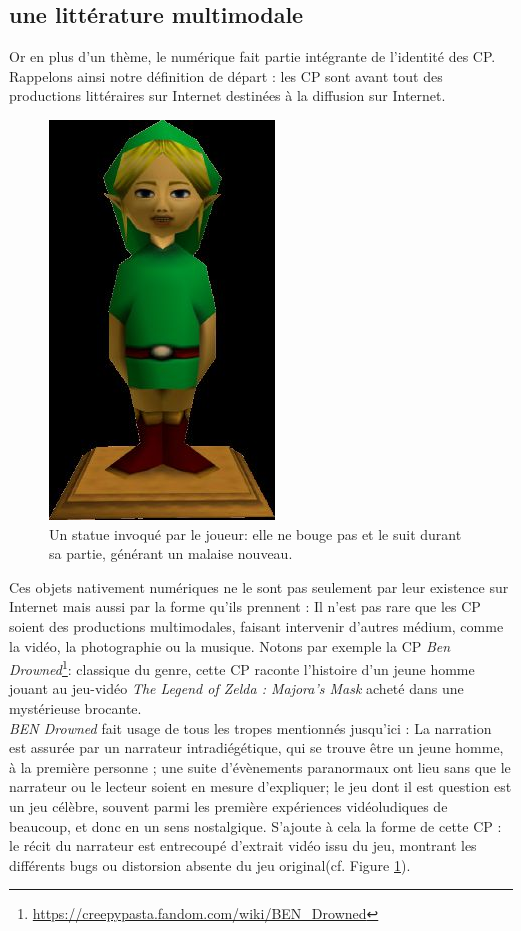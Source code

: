 \documentclass[12pt,a4paper,oneside,titlepage]{book} %
\begin{document}
\subsection{une littérature multimodale}
Or en plus d’un thème, le numérique fait partie intégrante de l’identité des CP. Rappelons ainsi notre définition de départ : les CP sont avant tout des productions littéraires sur Internet destinées à la diffusion sur Internet. 
	\begin{figure}
	\centering
	\includegraphics[scale=0.35]{illustration/ben_drowned1}
	\caption{\small Un statue invoqué par le joueur: elle ne bouge pas et le suit durant sa partie, générant un malaise nouveau.}
	\label{img:ben_drowned}
\end{figure}

Ces objets nativement numériques ne le sont pas seulement par leur existence sur Internet mais aussi par la forme qu’ils prennent : Il n’est pas rare que les CP soient des productions multimodales, faisant intervenir d’autres médium, comme la vidéo, la photographie ou la musique. Notons par exemple la CP \emph{Ben Drowned}\footnote{\url{https://creepypasta.fandom.com/wiki/BEN_Drowned}}: classique du genre, cette CP raconte l’histoire d’un jeune homme jouant au jeu-vidéo \emph{The Legend of Zelda : Majora's Mask} acheté dans une mystérieuse brocante. \\


\emph{BEN Drowned} fait usage de tous les tropes mentionnés jusqu'ici : La narration est assurée par un narrateur intradiégétique, qui se trouve être un jeune homme, à la première personne ;  une suite d'évènements paranormaux ont lieu sans que le narrateur ou le lecteur soient en mesure d'expliquer; le jeu dont il est question est un jeu célèbre, souvent parmi les première expériences vidéoludiques de beaucoup, et donc en un sens nostalgique.
S'ajoute à cela la forme de cette CP : le récit du narrateur est entrecoupé d'extrait vidéo issu du jeu, montrant les différents bugs ou distorsion absente du jeu original(cf. Figure \ref{img:ben_drowned}).
\end{document}
